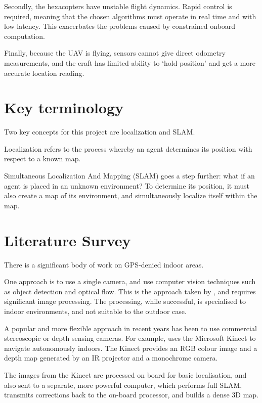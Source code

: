 \documentclass[12pt,oneside,a4paper]{book}
\begin{document}
Secondly, the hexacopters have unstable flight dynamics. Rapid control
is required, meaning that the chosen algorithms must operate in real
time and with low latency. This exacerbates the problems caused by
constrained onboard computation.

Finally, because the UAV is flying, sensors cannot give direct
odometry measurements, and the craft has limited ability to `hold
position' and get a more accurate location reading.

\section{Key terminology}
\label{sec:key-terminology}

Two key concepts for this project are localization and SLAM.

Localization refers to the process whereby an agent
determines its position with respect to a known map.

Simultaneous Localization And Mapping (SLAM) goes a step further: what
if an agent is placed in an unknown environment? To determine
its position, it must also create a map of its environment, and
simultaneously localize itself within the map.

\section{Literature Survey}
\label{sec:litsurvey}

There is a significant body of work on GPS-denied indoor areas.

One approach is to use a single camera, and use computer vision
techniques such as object detection and optical flow. This is the
approach taken by \cite{5152680}, and requires significant image
processing. The processing, while successful, is specialised to indoor
environments, and not suitable to the outdoor case.

A popular and more flexible approach in recent years has been to use
commercial stereoscopic or depth sensing cameras. For example,
\cite{huang2011visual} uses the Microsoft Kinect to navigate
autonomously indoors. The Kinect provides an RGB colour image and a
depth map generated by an IR projector and a monochrome camera.

The images from the Kinect are processed on board for basic
localisation, and also sent to a separate, more powerful computer,
which performs full SLAM, transmits corrections back to the on-board
processor, and builds a dense 3D map.
\end{document}
